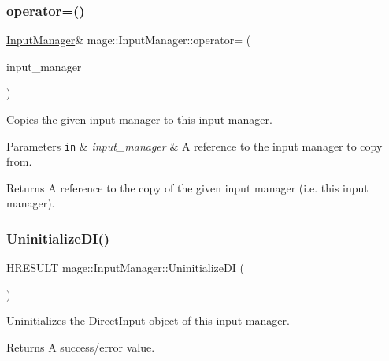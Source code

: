 \subsubsection{\texorpdfstring{operator=()}{operator=()}}
{\footnotesize\ttfamily \hyperlink{classmage_1_1_input_manager}{Input\+Manager}\& mage\+::\+Input\+Manager\+::operator= (\begin{DoxyParamCaption}\item[{const \hyperlink{classmage_1_1_input_manager}{Input\+Manager} \&}]{input\+\_\+manager }\end{DoxyParamCaption})\hspace{0.3cm}{\ttfamily [private]}}

Copies the given input manager to this input manager.


\begin{DoxyParams}[1]{Parameters}
\mbox{\tt in}  & {\em input\+\_\+manager} & A reference to the input manager to copy from. \\
\hline
\end{DoxyParams}
\begin{DoxyReturn}{Returns}
A reference to the copy of the given input manager (i.\+e. this input manager). 
\end{DoxyReturn}
\hypertarget{classmage_1_1_input_manager_af16e113638fed35d34256f99bf061ef4}{}\label{classmage_1_1_input_manager_af16e113638fed35d34256f99bf061ef4} 
\subsubsection{\texorpdfstring{Uninitialize\+D\+I()}{UninitializeDI()}}
{\footnotesize\ttfamily H\+R\+E\+S\+U\+LT mage\+::\+Input\+Manager\+::\+Uninitialize\+DI (\begin{DoxyParamCaption}{ }\end{DoxyParamCaption})\hspace{0.3cm}{\ttfamily [protected]}}

Uninitializes the Direct\+Input object of this input manager.

\begin{DoxyReturn}{Returns}
A success/error value. 
\end{DoxyReturn}
\hypertarget{classmage_1_1_input_manager_abecb06833973cab1ccabc7b28580209d}{}\label{classmage_1_1_input_manager_abecb06833973cab1ccabc7b28580209d} 

